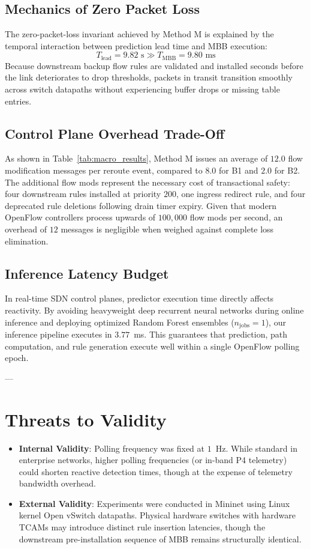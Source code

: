 \documentclass[journal,10pt,twocolumn]{IEEEtran}
\begin{document}
\subsection{Mechanics of Zero Packet Loss}
The zero-packet-loss invariant achieved by Method M is explained by the temporal interaction between prediction lead time and MBB execution:
$$T_{\text{lead}} = 9.82\text{ s} \gg T_{\text{MBB}} = 9.80\text{ ms}$$
Because downstream backup flow rules are validated and installed seconds before the link deteriorates to drop thresholds, packets in transit transition smoothly across switch datapaths without experiencing buffer drops or missing table entries.

\subsection{Control Plane Overhead Trade-Off}
As shown in Table~\ref{tab:macro_results}, Method M issues an average of $12.0$ flow modification messages per reroute event, compared to $8.0$ for B1 and $2.0$ for B2. The additional flow mods represent the necessary cost of transactional safety: four downstream rules installed at priority $200$, one ingress redirect rule, and four deprecated rule deletions following drain timer expiry. Given that modern OpenFlow controllers process upwards of $100{,}000$ flow mods per second, an overhead of $12$ messages is negligible when weighed against complete loss elimination.

\subsection{Inference Latency Budget}
In real-time SDN control planes, predictor execution time directly affects reactivity. By avoiding heavyweight deep recurrent neural networks during online inference and deploying optimized Random Forest ensembles ($n_{\text{jobs}} = 1$), our inference pipeline executes in $3.77$~ms. This guarantees that prediction, path computation, and rule generation execute well within a single OpenFlow polling epoch.

---

\section{Threats to Validity}
\label{sec:threats}
\begin{itemize}
    \item \textbf{Internal Validity}: Polling frequency was fixed at $1$~Hz. While standard in enterprise networks, higher polling frequencies (or in-band P4 telemetry) could shorten reactive detection times, though at the expense of telemetry bandwidth overhead.
    \item \textbf{External Validity}: Experiments were conducted in Mininet using Linux kernel Open vSwitch datapaths. Physical hardware switches with hardware TCAMs may introduce distinct rule insertion latencies, though the downstream pre-installation sequence of MBB remains structurally identical.
\end{itemize}
\end{document}
